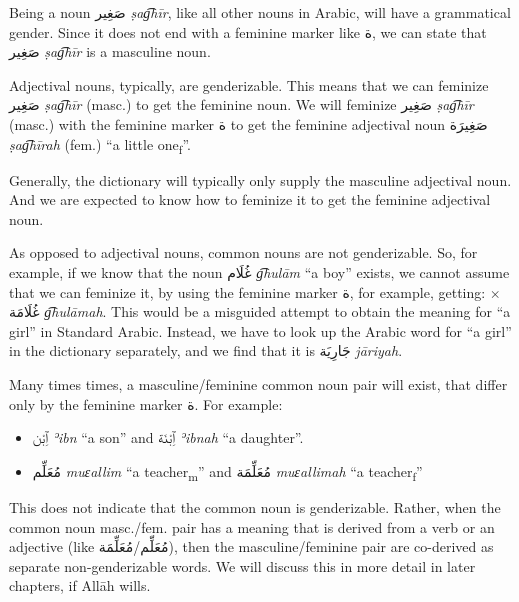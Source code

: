 \documentclass[
  10pt,
]{book}
\providecommand{\tightlist}{%
  \setlength{\itemsep}{0pt}\setlength{\parskip}{0pt}}
\begin{document}
Being a noun \foreignlanguage{arabic}{صَغِير} \emph{ṣag͡hīr}, like all other nouns in Arabic, will have a grammatical gender. Since it does not end with a feminine marker like \foreignlanguage{arabic}{ة}, we can state that
\foreignlanguage{arabic}{صَغِير} \emph{ṣag͡hīr} is a masculine noun.

Adjectival nouns, typically, are genderizable. This means that we can feminize
\foreignlanguage{arabic}{صَغِير} \emph{ṣag͡hīr} (masc.) to get the feminine noun.
We will feminize
\foreignlanguage{arabic}{صَغِير} \emph{ṣag͡hīr} (masc.) with the feminine marker \foreignlanguage{arabic}{ة} to get the feminine adjectival noun
\foreignlanguage{arabic}{صَغِيرَة} \emph{ṣag͡hīrah} (fem.) \enquote{a little one\textsubscript{f}}.

Generally, the dictionary will typically only supply the masculine adjectival noun.
And we are expected to know how to feminize it to get the feminine adjectival noun.

As opposed to adjectival nouns, common nouns are not genderizable. So, for example, if we know that the noun
\foreignlanguage{arabic}{غُلَام} \emph{g͡hulām} \enquote{a boy} exists, we cannot assume that we can feminize it, by using the feminine marker \foreignlanguage{arabic}{ة}, for example, getting: \(\times\) \foreignlanguage{arabic}{غُلَامَة} \emph{g͡hulāmah}. This would be a misguided attempt to obtain the meaning for \enquote{a girl} in Standard Arabic. Instead, we have to look up the Arabic word for \enquote{a girl} in the dictionary separately, and we find that it is \foreignlanguage{arabic}{جَارِيَة} \emph{jāriyah}.

Many times times, a masculine/feminine common noun pair will exist, that differ only by the feminine marker \foreignlanguage{arabic}{ة}. For example:

\begin{itemize}
\tightlist
\item
  \foreignlanguage{arabic}{ٱِبْن} \emph{ʾibn} \enquote{a son} and \foreignlanguage{arabic}{ٱِبْنَة} \emph{ʾibnah} \enquote{a daughter}.
\item
  \foreignlanguage{arabic}{مُعَلِّم} \emph{muɛallim} \enquote{a teacher\textsubscript{m}} and \foreignlanguage{arabic}{مُعَلِّمَة} \emph{muɛallimah} \enquote{a teacher\textsubscript{f}}
\end{itemize}

This does not indicate that the common noun is genderizable. Rather, when the common noun masc./fem. pair has a meaning that is derived from a verb or an adjective (like
\foreignlanguage{arabic}{مُعَلِّم}/\foreignlanguage{arabic}{مُعَلِّمَة}),
then the masculine/feminine pair are co-derived as separate non-genderizable words. We will discuss this in more detail in later chapters, if Allāh wills.
\end{document}

